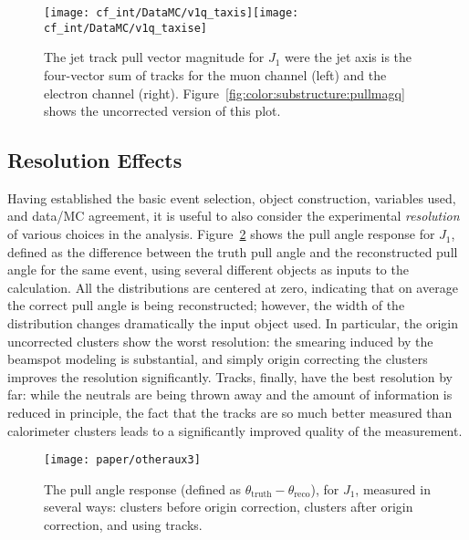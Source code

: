 \begin{figure}[h!]
\begin{center}
\texttt{[image: cf\_int/DataMC/v1q\_taxis]}\texttt{[image: cf\_int/DataMC/v1q\_taxise]}
 \caption{The jet track pull vector magnitude for $J_1$ were the jet axis is the four-vector sum of tracks for the muon channel (left) and the electron channel (right). Figure~\ref{fig:color:substructure:pullmagq} shows the uncorrected version of this plot. }
 \label{fig:color:substructure:pullmagq_fixed}
  \end{center}
\end{figure}



\FloatBarrier

	\subsection{Resolution Effects}
	\label{chapter:color:reconstruction:resolution}

Having established the basic event selection, object construction, variables used, and data/MC agreement, it is useful to also consider the experimental \textit{resolution} of various choices in the analysis. Figure~\ref{fig:color:resolution:objects} shows the pull angle response for $J_1$, defined as the difference between the truth pull angle and the reconstructed pull angle for the same event, using several different objects as inputs to the calculation. All the distributions are centered at zero, indicating that on average the correct pull angle is being reconstructed; however, the width of the distribution changes dramatically the input object used. In particular, the origin uncorrected clusters show the worst resolution: the smearing induced by the beamspot modeling is substantial, and simply origin correcting the clusters improves the resolution significantly. Tracks, finally, have the best resolution by far: while the neutrals are being thrown away and the amount of information is reduced in principle, the fact that the tracks are so much better measured than calorimeter clusters leads to a significantly improved quality of the measurement.



\begin{figure}[h!]
\begin{center}
\texttt{[image: paper/otheraux3]}
 \caption{The pull angle response (defined as $\theta_\mathrm{truth} - \theta_\mathrm{reco}$), for $J_1$, measured in several ways: clusters before origin correction, clusters after origin correction, and using tracks.}
 \label{fig:color:resolution:objects}
  \end{center}
\end{figure}

